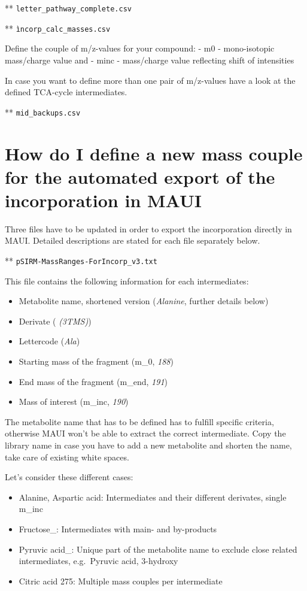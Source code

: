 \documentclass[]{book}
\providecommand{\tightlist}{%
  \setlength{\itemsep}{0pt}\setlength{\parskip}{0pt}}
\begin{document}
** \texttt{letter\_pathway\_complete.csv}

** \texttt{ìncorp\_calc\_masses.csv}

Define the couple of m/z-values for your compound:
- m0 - mono-isotopic mass/charge value and
- minc - mass/charge value reflecting shift of intensities

In case you want to define more than one pair of m/z-values have a look at the defined TCA-cycle intermediates.

** \texttt{mid\_backups.csv}

\hypertarget{maui-incorp}{%
\section{How do I define a new mass couple for the automated export of the incorporation in MAUI}\label{maui-incorp}}

Three files have to be updated in order to export the incorporation directly in MAUI. Detailed descriptions are stated for each file separately below.

** \texttt{pSIRM-MassRanges-ForIncorp\_v3.txt}

This file contains the following information for each intermediates:

\begin{itemize}
\tightlist
\item
  Metabolite name, shortened version (\emph{Alanine}, further details below)
\item
  Derivate ( \emph{(3TMS)})
\item
  Lettercode (\emph{Ala})
\item
  Starting mass of the fragment (m\_0, \emph{188})
\item
  End mass of the fragment (m\_end, \emph{191})
\item
  Mass of interest (m\_inc, \emph{190})
\end{itemize}

The metabolite name that has to be defined has to fulfill specific criteria, otherwise MAUI won't be able to extract the correct intermediate. Copy the library name in case you have to add a new metabolite and shorten the name, take care of existing white spaces.

Let's consider these different cases:

\begin{itemize}
\tightlist
\item
  Alanine, Aspartic acid: Intermediates and their different derivates, single m\_inc
\item
  Fructose\_: Intermediates with main- and by-products
\item
  Pyruvic acid\_: Unique part of the metabolite name to exclude close related intermediates, e.g.~Pyruvic acid, 3-hydroxy
\item
  Citric acid 275: Multiple mass couples per intermediate
\end{itemize}
\end{document}
